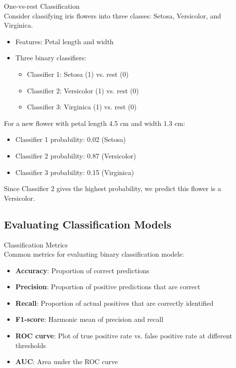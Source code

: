 \begin{example2}{One-vs-rest Classification}\\
Consider classifying iris flowers into three classes: Setosa, Versicolor, and Virginica.
\begin{itemize}
    \item Features: Petal length and width
    \item Three binary classifiers:
    \begin{itemize}
        \item Classifier 1: Setosa (1) vs. rest (0)
        \item Classifier 2: Versicolor (1) vs. rest (0)
        \item Classifier 3: Virginica (1) vs. rest (0)
    \end{itemize}
\end{itemize}
\tcblower
For a new flower with petal length 4.5 cm and width 1.3 cm:
\begin{itemize}
    \item Classifier 1 probability: 0.02 (Setosa)
    \item Classifier 2 probability: 0.87 (Versicolor)
    \item Classifier 3 probability: 0.15 (Virginica)
\end{itemize}
Since Classifier 2 gives the highest probability, we predict this flower is a Versicolor.
\end{example2}

\subsection{Evaluating Classification Models}

\begin{definition}{Classification Metrics}\\
Common metrics for evaluating binary classification models:
\begin{itemize}
    \item \textbf{Accuracy}: Proportion of correct predictions
    \item \textbf{Precision}: Proportion of positive predictions that are correct
    \item \textbf{Recall}: Proportion of actual positives that are correctly identified
    \item \textbf{F1-score}: Harmonic mean of precision and recall
    \item \textbf{ROC curve}: Plot of true positive rate vs. false positive rate at different thresholds
    \item \textbf{AUC}: Area under the ROC curve
\end{itemize}
\end{definition}

